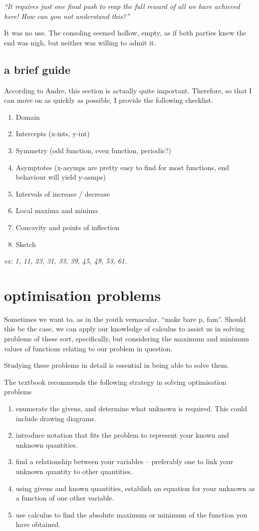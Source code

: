 \documentclass[10pt,a4paper]{report}
\begin{document}
\noindent \emph{``It requires just one final push to reap the full reward of all we have achieved here! How can you not understand this?''}

It was no use. The consoling seemed hollow, empty, as if both parties knew the end was nigh, but neither was willing to admit it.

\subsection{a brief guide}

According to Andre, this section is actually quite important. Therefore, so that I can move on as quickly as possible, I provide the following checklist.

\begin{enumerate}
	\item Domain
	\item Intercepts (x-ints, y-int)
	\item Symmetry (odd function, even function, periodic?)
	\item Asymptotes (x-asymps are pretty easy to find for most functions, end behaviour will yield y-asmps)
	\item Intervals of increase / decrease
	\item Local maxima and minima
	\item Concavity and points of inflection
	\item Sketch
\end{enumerate}

\emph{ex: 1, 11, 23, 31, 33, 39, 45, 49, 53, 61.}

\section{optimisation problems}

Sometimes we want to, as in the youth vernacular, ``make bare p, fam''. Should this be the case, we can apply our knowledge of calculus to assist us in solving problems of these sort, specifically, but considering the maximum and minimum values of functions relating to our problem in question.

Studying these problems in detail is essential in being able to solve them.

The textbook recommends the following strategy in solving optimisation problems

\begin{enumerate}
	\item enumerate the givens, and determine what unknown is required. This could include drawing diagrams.
	\item introduce notation that fits the problem to represent your known and unknown quantities.
	\item find a relationship between your variables -- preferably one to link your unknown quantity to other quantities.
	\item using givens and known quantities, establish an equation for your unknown as a function of one other variable.
	\item use calculus to find the absolute maximum or minimum of the function you have obtained.
\end{enumerate}
\end{document}

